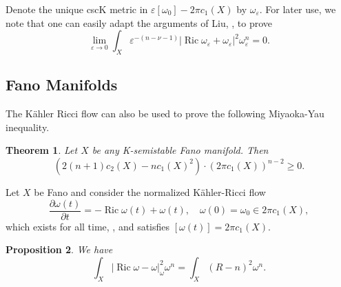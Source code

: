 \documentclass[12pt]{article}
\newtheorem{theorem}{Theorem}[section]
\newtheorem{proposition}[theorem]{Proposition}
\numberwithin{equation}{section}
\renewcommand{\d}{\partial}
\newcommand{\e}{\varepsilon}
\DeclareMathOperator{\Ric}{Ric}
\begin{document}
\noindent Denote the unique cscK metric in $\e [\omega_0] - 2 \pi c_1(X)$ by $\omega_{\e}$. For later use, we note that one can easily adapt the arguments of Liu, \cite{L23}, to prove
\begin{equation}\label{nef_L2_ricci_limit}
    \lim_{\e \to 0} \int_X \e^{-(n-\nu-1)}|\Ric \omega_{\e} + \omega_{\e}|^2 \omega_{\e}^n = 0.
\end{equation}

\subsection{Fano Manifolds}

The K\"ahler Ricci flow can also be used to prove the following Miyaoka-Yau inequality.

\begin{theorem}\label{fano_MY}
Let $X$ be any K-semistable Fano manifold. Then
\begin{equation*}
    (2(n+1) c_2(X) - n c_1(X)^2) \cdot (2\pi c_1(X))^{n-2} \geq 0.
\end{equation*}
\end{theorem}

\noindent Let $X$ be Fano and consider the normalized K\"ahler-Ricci flow
\begin{equation*}
    \frac{\d \omega(t)}{\d t} = -\Ric 
    \omega(t) + \omega(t), \quad \omega(0) = \omega_0 \in 2 \pi c_1(X),
\end{equation*}
which exists for all time, \cite{TZ06,BEG13}, and satisfies $[\omega(t)] = 2 \pi c_1(X)$. 

\begin{proposition}\label{L2_ricci_scalar_equality}
We have
 \begin{equation*}
     \int_X |\Ric \omega - \omega|_{\omega}^2 \omega^n = \int_X (R-n)^2 \omega^n. 
 \end{equation*}
\end{proposition}
\end{document}
